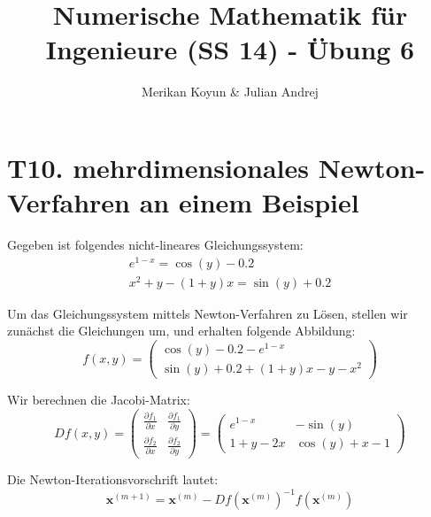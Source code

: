 \documentclass[11pt]{article}
\theoremstyle{plain}
\theoremstyle{definition}
\let\mbb\boldsymbol
\renewcommand\boldsymbol{\mbb}
\renewcommand{\a}{\"{a}}
\renewcommand{\o}{\"{o}}
\renewcommand{\u}{\"{u}}
\begin{document}
\title{Numerische Mathematik f\u r Ingenieure (SS 14) - \"{U}bung 6}
\author{Merikan Koyun \& Julian Andrej}
\maketitle

\section*{T10. mehrdimensionales Newton-Verfahren an einem Beispiel}
Gegeben ist folgendes nicht-lineares Gleichungssystem:
\begin{align}
e^{1-x} = \cos(y)-0.2 \\
x^2+y-(1+y)x = \sin(y)+0.2
\end{align}

Um das Gleichungssystem mittels Newton-Verfahren zu L\o sen, stellen wir zun\a chst die Gleichungen um, und erhalten folgende Abbildung:
\begin{equation}
f(x,y) = 
\begin{pmatrix}
\cos(y) - 0.2 - e^{1-x} \\
\sin(y) + 0.2 + (1+y)x - y -x^2
\end{pmatrix}
\end{equation}

Wir berechnen die Jacobi-Matrix:
\begin{equation}
Df(x,y) =
\begin{pmatrix}
\frac{\partial f_1}{\partial x} & \frac{\partial f_1}{\partial y} \\
\frac{\partial f_2}{\partial x} & \frac{\partial f_2}{\partial y}
\end{pmatrix}
=
\begin{pmatrix}
e^{1-x} & -\sin(y) \\ 
1+y-2x & \cos(y)+x-1
\end{pmatrix}
\end{equation}

Die Newton-Iterationsvorschrift lautet:
\begin{equation}
\mbb{x}^{(m+1)} = \mbb{x}^{(m)} - Df(\mbb{x}^{(m)})^{-1} f(\mbb{x}^{(m)})
\end{equation}
\end{document}
